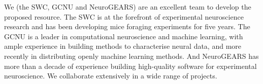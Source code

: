We (the SWC, GCNU and NeuroGEARS) are an excellent team to develop the proposed
resource. The SWC is at the forefront of experimental neuroscience research and
has been developing mice foraging experiments for five years. The GCNU is a
leader in computational neuroscience and machine learning, with ample
experience in building methods to characterise neural data, and more recently
in distributing openly machine learning methods. And NeuroGEARS has more than a
decade of experience building high-quality software for experimental
neuroscience. We collaborate extensively in a wide range of projects.

